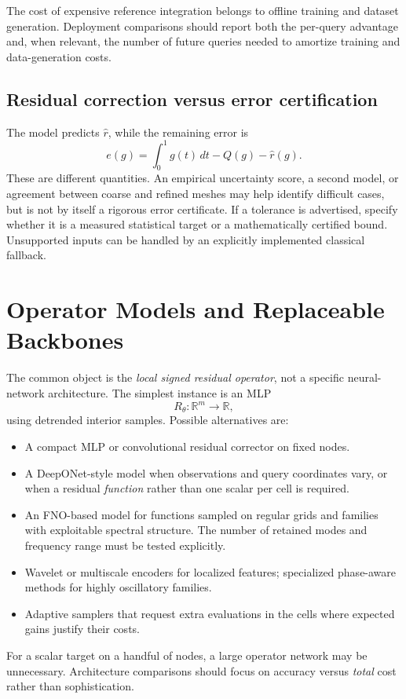 The cost of expensive reference integration belongs to offline training
and dataset generation. Deployment comparisons should report both the
per-query advantage and, when relevant, the number of future queries
needed to amortize training and data-generation costs.

\subsection{Residual correction versus error certification}

The model predicts $\widehat r$, while the remaining error is
\[
    e(g)=\int_0^1g(t)\,dt-Q(g)-\widehat r(g).
\]
These are different quantities. An empirical uncertainty score, a second
model, or agreement between coarse and refined meshes may help identify
difficult cases, but is not by itself a rigorous error certificate.
If a tolerance is advertised, specify whether it is a measured statistical
target or a mathematically certified bound. Unsupported inputs can be
handled by an explicitly implemented classical fallback.

\section{Operator Models and Replaceable Backbones}
\label{sec:resop-zoo}

The common object is the \emph{local signed residual operator}, not a
specific neural-network architecture. The simplest instance is an MLP
\[
    R_\theta:\mathbb R^m\to\mathbb R,
\]
using detrended interior samples. Possible alternatives are:
\begin{itemize}
    \item A compact MLP or convolutional residual corrector on fixed nodes.
    \item A DeepONet-style model when observations and query coordinates
          vary, or when a residual \emph{function} rather than one scalar
          per cell is required.
    \item An FNO-based model for functions sampled on regular grids and
          families with exploitable spectral structure. The number of
          retained modes and frequency range must be tested explicitly.
    \item Wavelet or multiscale encoders for localized features; specialized
          phase-aware methods for highly oscillatory families.
    \item Adaptive samplers that request extra evaluations in the cells
          where expected gains justify their costs.
\end{itemize}
For a scalar target on a handful of nodes, a large operator network may
be unnecessary. Architecture comparisons should focus on accuracy versus
\emph{total} cost rather than sophistication.

